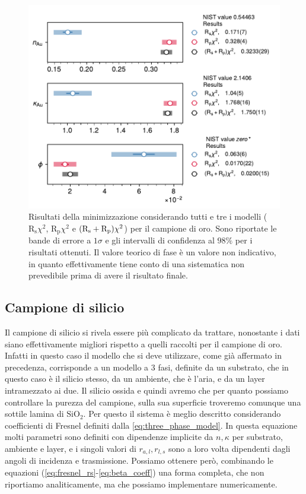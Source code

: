 \documentclass[
    prb,altaffilletter,citeautoscript,
    amsmath,amssymb,
    showpacs,showkeys,floatfix,
    reprint
]{revtex4-1}
\begin{document}
\begin{figure}
    \centering
    \includegraphics[width=\linewidth]{figures/Au_results_all.pdf}
    \caption{Risultati della minimizzazione considerando tutti e tre i modelli ($\mathrm{R_s}\chi^2$, $\mathrm{R_p}\chi^2$ e $\qty(\mathrm{R_s}+ \mathrm{R_p})\chi^2$) per il campione di oro. Sono riportate le bande di errore a $1\sigma$ e gli intervalli di confidenza al $98\%$ per i risultati ottenuti. Il valore teorico di fase è un valore non indicativo, in quanto effettivamente tiene conto di una sistematica non prevedibile prima di avere il risultato finale.}
    \label{fig:Au_results_all}
\end{figure}



\subsection{Campione di silicio}

Il campione di silicio si rivela essere più complicato da trattare, nonostante i dati siano effettivamente migliori rispetto a quelli raccolti per il campione di oro. Infatti in questo caso il modello che si deve utilizzare, come già affermato in precedenza, corrisponde a un modello a 3 fasi, definite da un substrato, che in questo caso è il silicio stesso, da un ambiente, che è l'aria, e da un layer intramezzato ai due. Il silicio ossida e quindi avremo che per quanto possiamo controllare la purezza del campione, sulla sua superficie troveremo comunque una sottile lamina di $\mathrm{SiO_2}$. Per questo il sistema è meglio descritto considerando coefficienti di Fresnel definiti dalla \eqref{eq:three_phase_model}. In questa equazione molti parametri sono definiti con dipendenze implicite da $n, \kappa$ per substrato, ambiente e layer, e i singoli valori di $r_{a,l}, r_{l,s}$ sono a loro volta dipendenti dagli angoli di incidenza e trasmissione. Possiamo ottenere però, combinando le equazioni (\ref{eq:fresnel_rs}-\ref{eq:beta_coeff}) una forma completa, che non riportiamo analiticamente, ma che possiamo implementare numericamente. 
\end{document}
